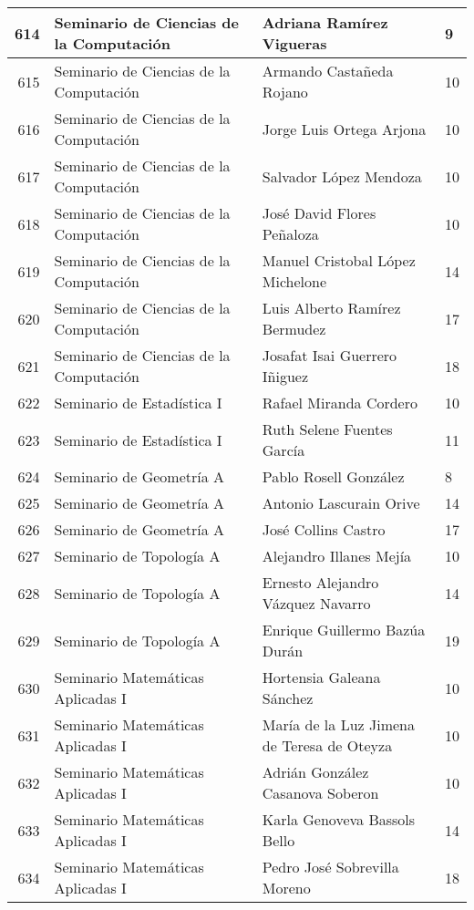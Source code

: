 \begin{table}[ht]
\begin{tabular}{rlll}
  614 & Seminario de Ciencias de la Computación & Adriana Ramírez Vigueras & 9 \\ \hline
  615 & Seminario de Ciencias de la Computación & Armando Castañeda Rojano & 10 \\ \hline
  616 & Seminario de Ciencias de la Computación & Jorge Luis Ortega Arjona & 10 \\ \hline
  617 & Seminario de Ciencias de la Computación & Salvador López Mendoza & 10 \\ \hline
  618 & Seminario de Ciencias de la Computación & José David Flores Peñaloza & 10 \\ \hline
  619 & Seminario de Ciencias de la Computación & Manuel Cristobal López Michelone & 14 \\ \hline
  620 & Seminario de Ciencias de la Computación & Luis Alberto Ramírez Bermudez & 17 \\ \hline
  621 & Seminario de Ciencias de la Computación & Josafat Isai Guerrero Iñiguez & 18 \\ \hline
  622 & Seminario de Estadística I & Rafael Miranda Cordero & 10 \\ \hline
  623 & Seminario de Estadística I & Ruth Selene Fuentes García & 11 \\ \hline
  624 & Seminario de Geometría A & Pablo Rosell González & 8 \\ \hline
  625 & Seminario de Geometría A & Antonio Lascurain Orive & 14 \\ \hline
  626 & Seminario de Geometría A & José Collins Castro & 17 \\ \hline
  627 & Seminario de Topología A & Alejandro Illanes Mejía & 10 \\ \hline
  628 & Seminario de Topología A & Ernesto Alejandro Vázquez Navarro & 14 \\ \hline
  629 & Seminario de Topología A & Enrique Guillermo Bazúa Durán & 19 \\ \hline
  630 & Seminario Matemáticas Aplicadas I & Hortensia Galeana Sánchez & 10 \\ \hline
  631 & Seminario Matemáticas Aplicadas I & María de la Luz Jimena de Teresa de Oteyza & 10 \\ \hline
  632 & Seminario Matemáticas Aplicadas I & Adrián González Casanova Soberon & 10 \\ \hline
  633 & Seminario Matemáticas Aplicadas I & Karla Genoveva Bassols Bello & 14 \\ \hline
  634 & Seminario Matemáticas Aplicadas I & Pedro José Sobrevilla Moreno & 18 \\ \hline

\end{tabular}
\end{table}
